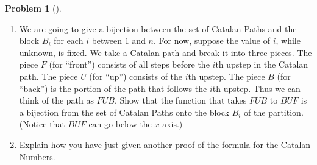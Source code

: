 \documentclass[10pt,]{book}
\theoremstyle{plain}
\theoremstyle{definition}
\newtheorem{activity}[project]{Problem}
\theoremstyle{definition}
\numberwithin{equation}{chapter}
\begin{document}
\begin{activity}[]
\begin{enumerate}[font=\bfseries,label=(\alph*),ref=\alph*]
\item\label{task-63}  We are going to give a bijection between the set of Catalan Paths and the block \(B_i\) for each \(i\) between \(1\) and \(n\).  For now, suppose the value of \(i\), while unknown, is fixed.  We take a Catalan path and break it into three pieces.  The piece \(F\) (for ``front'') consists of all steps before the \(i\)th upstep in the Catalan path.  The piece \(U\) (for ``up'') consists of the \(i\)th upstep.  The piece \(B\) (for ``back'') is the portion of the path that follows the \(i\)th upstep.  Thus we can think of the path as \(FUB\).  Show that the function that takes \(FUB\) to \(BUF\) is a bijection from the set of Catalan Paths onto the block \(B_i\) of the partition.  (Notice that \(BUF\) can go below the \(x\) axis.)%
\item\label{task-64} \marginsymbol[-2.5em]{} Explain how you have just given another proof of the formula for the Catalan Numbers.%
\end{enumerate}
\end{activity}
\typeout{************************************************}
\typeout{************************************************}
\end{document}
